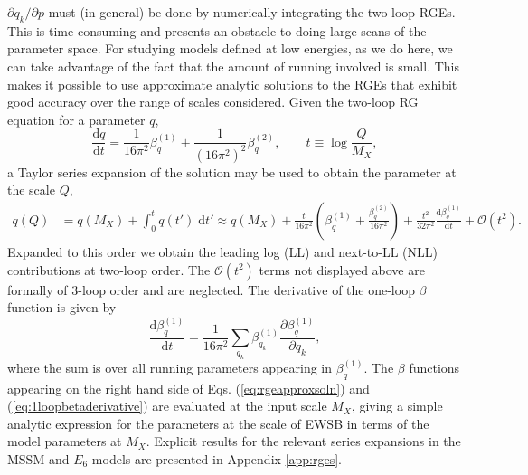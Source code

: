 \documentclass[preprint,amsmath,amssymb,aps,superscriptaddress,prd,showpacs,floatfix,nofootinbib]{revtex4-1}
\begin{document}
$\partial q_k/\partial p$ must (in general) be done by numerically
integrating the two-loop RGEs. This is time consuming and presents an
obstacle to doing large scans of the parameter space. For studying
models defined at low energies, as we do here, we can take advantage
of the fact that the amount of running involved is small. This makes
it possible to use approximate analytic solutions to the RGEs that
exhibit good accuracy over the range of scales considered. Given the
two-loop RG equation for a parameter $q$,
\begin{equation}\label{eq:rge}
\frac{\textrm{d}q}{\mathrm{d}t}=\frac{1}{16\pi^2}\beta_q^{(1)}+\frac{1}{(16\pi^2)^2}\beta_q^{(2)},\qquad t\equiv \log\frac{Q}{M_X},
\end{equation}
a Taylor series expansion of the solution may be used to obtain the
parameter at the scale $Q$,
\begin{align}\label{eq:rgeapproxsoln}
q(Q)&=q(M_X)+\int_0^t q(t')\;\textrm{d}t'\approx q(M_X)+\frac{t}{16\pi^2}\left ( \beta_q^{(1)}+\frac{\beta_q^{(2)}}{16\pi^2}\right )+\frac{t^2}{32\pi^2}\frac{\textrm{d}\beta_q^{(1)}}{\textrm{d}t}+\mathcal{O}(t^2).
\end{align}
Expanded to this order we obtain the leading log (LL) and next-to-LL
(NLL) contributions at two-loop order. The $\mathcal{O}(t^2)$ terms
not displayed above are formally of 3-loop order and are
neglected. The derivative of the one-loop $\beta$ function is given by
\begin{equation}\label{eq:1loopbetaderivative}
\frac{\textrm{d}\beta_q^{(1)}}{\textrm{d}t}=\frac{1}{16\pi^2}\sum_{q_k}\beta_{q_k}^{(1)}\frac{\partial \beta_q^{(1)}}{\partial q_k},
\end{equation}
where the sum is over all running parameters appearing in
$\beta_q^{(1)}$. The $\beta$ functions appearing on the right hand
side of Eqs. (\ref{eq:rgeapproxsoln}) and
(\ref{eq:1loopbetaderivative}) are evaluated at the input scale $M_X$,
giving a simple analytic expression for the parameters at the scale of
EWSB in terms of the model parameters at $M_X$. Explicit results for
the relevant series expansions in the MSSM and $E_6$ models are
presented in Appendix \ref{app:rges}.
\end{document}
